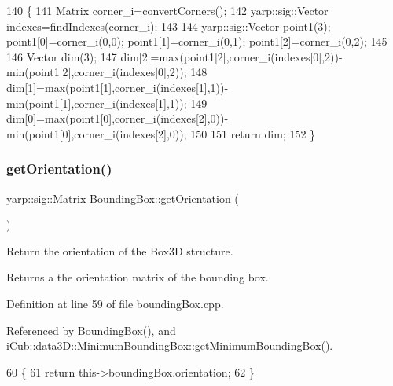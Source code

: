 \begin{DoxyCode}
140 \{
141     Matrix corner\_i=convertCorners();
142     yarp::sig::Vector indexes=findIndexes(corner\_i);
143 
144     yarp::sig::Vector point1(3); point1[0]=corner\_i(0,0); point1[1]=corner\_i(0,1); point1[2]=corner\_i(0,2);
145 
146     Vector dim(3);
147     dim[2]=max(point1[2],corner\_i(indexes[0],2))-min(point1[2],corner\_i(indexes[0],2));
148     dim[1]=max(point1[1],corner\_i(indexes[1],1))-min(point1[1],corner\_i(indexes[1],1));
149     dim[0]=max(point1[0],corner\_i(indexes[2],0))-min(point1[0],corner\_i(indexes[2],0));
150 
151     \textcolor{keywordflow}{return} dim;
152 \}
\end{DoxyCode}
\label{classiCub_1_1data3D_1_1BoundingBox_a2f5c9ef6a7d295e0ae60d1bf51c236b6} 
\subsubsection{\texorpdfstring{get\+Orientation()}{getOrientation()}}
{\footnotesize\ttfamily yarp\+::sig\+::\+Matrix Bounding\+Box\+::get\+Orientation (\begin{DoxyParamCaption}{ }\end{DoxyParamCaption})}



Return the orientation of the Box3D structure. 

\begin{DoxyReturn}{Returns}
a the orientation matrix of the bounding box. 
\end{DoxyReturn}


Definition at line 59 of file bounding\+Box.\+cpp.



Referenced by Bounding\+Box(), and i\+Cub\+::data3\+D\+::\+Minimum\+Bounding\+Box\+::get\+Minimum\+Bounding\+Box().


\begin{DoxyCode}
60 \{
61     \textcolor{keywordflow}{return} this->boundingBox.orientation;
62 \}
\end{DoxyCode}
\label{classiCub_1_1data3D_1_1BoundingBox_ab9c2a8dfb61a2c0c02529968df5a2e2e} 
